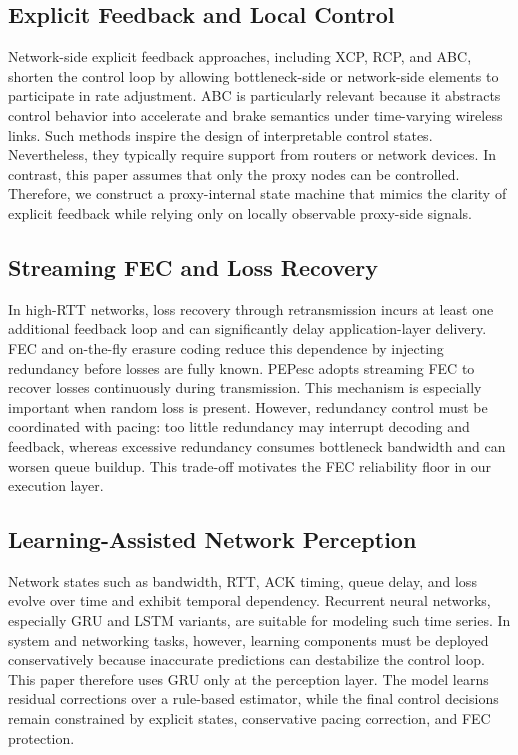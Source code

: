 \subsection{Explicit Feedback and Local Control}
Network-side explicit feedback approaches, including XCP, RCP, and ABC, shorten the control loop by allowing bottleneck-side or network-side elements to participate in rate adjustment. ABC is particularly relevant because it abstracts control behavior into accelerate and brake semantics under time-varying wireless links. Such methods inspire the design of interpretable control states. Nevertheless, they typically require support from routers or network devices. In contrast, this paper assumes that only the proxy nodes can be controlled. Therefore, we construct a proxy-internal state machine that mimics the clarity of explicit feedback while relying only on locally observable proxy-side signals.

\subsection{Streaming FEC and Loss Recovery}
In high-RTT networks, loss recovery through retransmission incurs at least one additional feedback loop and can significantly delay application-layer delivery. FEC and on-the-fly erasure coding reduce this dependence by injecting redundancy before losses are fully known. PEPesc adopts streaming FEC to recover losses continuously during transmission. This mechanism is especially important when random loss is present. However, redundancy control must be coordinated with pacing: too little redundancy may interrupt decoding and feedback, whereas excessive redundancy consumes bottleneck bandwidth and can worsen queue buildup. This trade-off motivates the FEC reliability floor in our execution layer.

\subsection{Learning-Assisted Network Perception}
Network states such as bandwidth, RTT, ACK timing, queue delay, and loss evolve over time and exhibit temporal dependency. Recurrent neural networks, especially GRU and LSTM variants, are suitable for modeling such time series. In system and networking tasks, however, learning components must be deployed conservatively because inaccurate predictions can destabilize the control loop. This paper therefore uses GRU only at the perception layer. The model learns residual corrections over a rule-based estimator, while the final control decisions remain constrained by explicit states, conservative pacing correction, and FEC protection.
